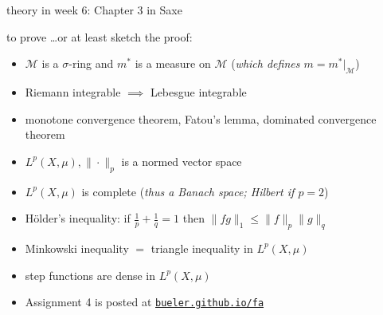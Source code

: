 \documentclass[10pt,
               svgnames,
               hyperref={colorlinks,
                         citecolor=DeepPink4,
                         linkcolor=FireBrick,
                         urlcolor=blue},
               usepdftitle=false]{beamer}
\newcommand{\cM}{\mathcal{M}}
\begin{document}
\begin{frame}{theory in week 6: Chapter 3 in Saxe}

\begin{block}{to prove \dots or at least sketch the proof:}
\begin{itemize}
\item $\cM$ is a $\sigma$-ring and $m^*$ is a measure on $\cM$ \hfill (\emph{which defines $m=m^*|_{\cM}$})
\item Riemann integrable $\implies$ Lebesgue integrable
\item monotone convergence theorem, Fatou's lemma, dominated convergence theorem
\item $L^p(X,\mu), \|\cdot\|_p$ is a normed vector space
\item $L^p(X,\mu)$ is complete \hfill (\emph{thus a Banach space; Hilbert if $p=2$})
\item H\"older's inequality: if $\frac{1}{p} + \frac{1}{q} = 1$ then $\|fg\|_1 \le \|f\|_p\|g\|_q$
\item Minkowski inequality $=$ triangle inequality in $L^p(X,\mu)$
\item step functions are dense in $L^p(X,\mu)$
\end{itemize}
\end{block}

\begin{itemize}
\item Assignment 4 is posted at \quad  \href{https://bueler.github.io/fa/index.html}{\texttt{bueler.github.io/fa}}
\end{itemize}
\end{frame}
\end{document}
